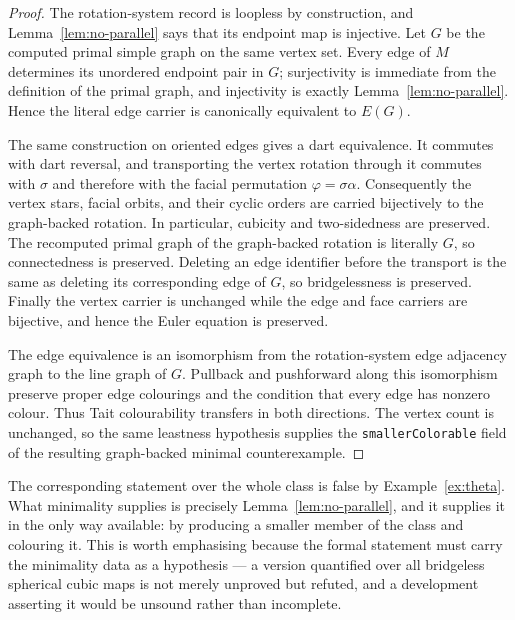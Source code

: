 \begin{proof}
The rotation-system record is loopless by construction, and
Lemma~\ref{lem:no-parallel} says that its endpoint map is injective.  Let
$G$ be the computed primal simple graph on the same vertex set.  Every edge
of $M$ determines its unordered endpoint pair in $G$; surjectivity is
immediate from the definition of the primal graph, and injectivity is exactly
Lemma~\ref{lem:no-parallel}.  Hence the literal edge carrier is canonically
equivalent to $E(G)$.

The same construction on oriented edges gives a dart equivalence.  It
commutes with dart reversal, and transporting the vertex rotation through it
commutes with $\sigma$ and therefore with the facial permutation
$\varphi=\sigma\alpha$.  Consequently the vertex stars, facial orbits, and
their cyclic orders are carried bijectively to the graph-backed rotation.
In particular, cubicity and two-sidedness are preserved.  The recomputed
primal graph of the graph-backed rotation is literally $G$, so connectedness
is preserved.  Deleting an edge identifier before the transport is the same
as deleting its corresponding edge of $G$, so bridgelessness is preserved.
Finally the vertex carrier is unchanged while the edge and face carriers are
bijective, and hence the Euler equation is preserved.

The edge equivalence is an isomorphism from the rotation-system edge
adjacency graph to the line graph of $G$.  Pullback and pushforward along this
isomorphism preserve proper edge colourings and the condition that every edge
has nonzero colour.  Thus Tait colourability transfers in both directions.
The vertex count is unchanged, so the same leastness hypothesis supplies the
\texttt{smallerColorable} field of the resulting graph-backed minimal
counterexample.
\end{proof}

\begin{remark}
\Sprose
The corresponding statement over the whole class is false by
Example~\ref{ex:theta}. What minimality supplies is precisely
Lemma~\ref{lem:no-parallel}, and it supplies it in the only way available:
by producing a smaller member of the class and colouring it. This is worth
emphasising because the formal statement must carry the minimality data as a
hypothesis --- a version quantified over all bridgeless spherical cubic maps
is not merely unproved but refuted, and a development asserting it would be
unsound rather than incomplete.
\end{remark}

